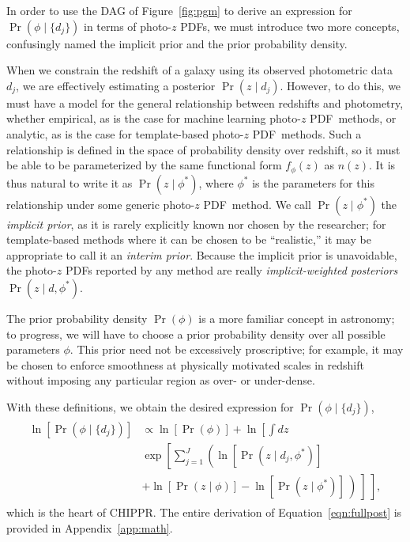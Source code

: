\documentclass[iop]{emulateapj}
\newcommand{\chippr}{CHIPPR}
\newcommand{\nz}{$n(z)$}
\newcommand{\pzpdf}{photo-$z$ PDF}
\begin{document}
In order to use the DAG of Figure~\ref{fig:pgm} to derive an expression for 
$\Pr(\phi \mid \{d_{j}\})$ in terms of \pzpdf s, we must introduce two more 
concepts, confusingly named the implicit prior and the prior probability 
density.

When we constrain the redshift of a galaxy using its observed photometric data 
$d_{j}$, we are effectively estimating a posterior $\Pr(z \mid d_{j})$.
However, to do this, we must have a model for the general relationship between 
redshifts and photometry, whether empirical, as is the case for machine 
learning \pzpdf\ methods, or analytic, as is the case for template-based 
\pzpdf\ methods.
Such a relationship is defined in the space of probability density over 
redshift, so it must be able to be parameterized by the same functional form 
$f_{\phi}(z)$ as \nz .
It is thus natural to write it as $\Pr(z \mid \phi^{*})$, where $\phi^{*}$ is 
the parameters for this relationship under some generic \pzpdf\ method.
We call $\Pr(z \mid \phi^{*})$ the \textit{implicit prior}, as it is rarely 
explicitly known nor chosen by the researcher; for template-based methods where 
it can be chosen to be ``realistic,'' it may be appropriate to call it an 
\textit{interim prior}.
Because the implicit prior is unavoidable, the \pzpdf s reported by any method 
are really \textit{implicit-weighted posteriors} $\Pr(z \mid d, \phi^{*})$.

The prior probability density $\Pr(\phi)$ is a more familiar concept in 
astronomy; to progress, we will have to choose a prior probability density over 
all possible parameters $\phi$.
This prior need not be excessively proscriptive; for example, it may be chosen 
to enforce smoothness at physically motivated scales in redshift without 
imposing any particular region as over- or under-dense.

With these definitions, we obtain the desired expression for $\Pr(\phi \mid 
\{d_{j}\})$,
\begin{align}
\begin{split}
  \label{eqn:fullpost}
  \ln[\Pr(\phi \mid \{d_{j}\})] & \propto \ln[\Pr(\phi)] + \ln \left[\int dz 
\right.\\
  & \left. \exp \left[\sum_{j=1}^{J} \left(\ln[\Pr(z \mid d_{j}, \phi^{*})] 
\right. \right. \right.\\
  & \left. \left. \left. + \ln[\Pr(z \mid \phi)] - \ln[\Pr(z \mid \phi^{*})]\ 
\right)\ \right]\ \right] ,
\end{split}
\end{align}
which is the heart of \chippr.
The entire derivation of Equation~\ref{eqn:fullpost} is provided in 
Appendix~\ref{app:math}.
\end{document}
